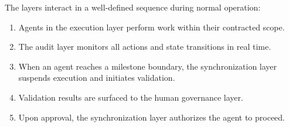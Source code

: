 The layers interact in a well-defined sequence during normal operation:

\begin{enumerate}
  \item Agents in the execution layer perform work within their contracted scope.
  \item The audit layer monitors all actions and state transitions in real time.
  \item When an agent reaches a milestone boundary, the synchronization layer
    suspends execution and initiates validation.
  \item Validation results are surfaced to the human governance layer.
  \item Upon approval, the synchronization layer authorizes the agent to proceed.
\end{enumerate}

